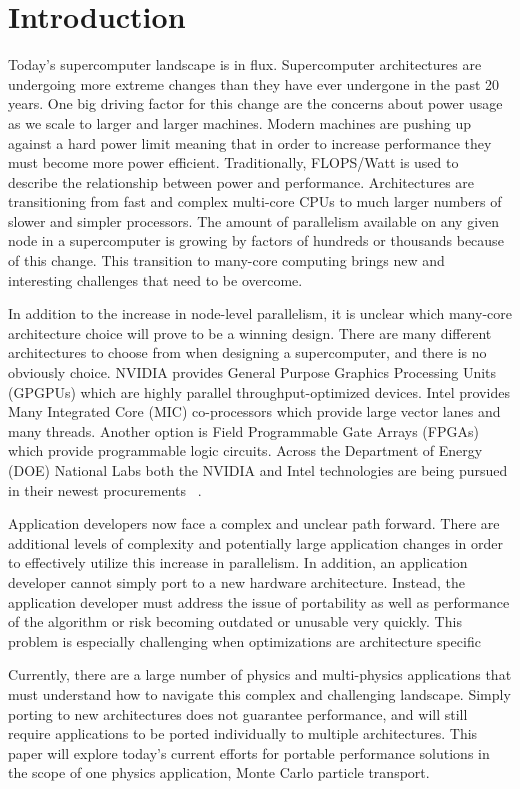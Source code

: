 \section{ \textbf{Introduction}}

Today's supercomputer landscape is in flux.
%
Supercomputer architectures are undergoing more extreme changes than they have ever undergone in the past 20 years.
%
One big driving factor for this change are the concerns about power usage as we scale to larger and larger machines.
%
Modern machines are pushing up against a hard power limit meaning that in order to increase performance they must become more power efficient.
%
Traditionally, FLOPS/Watt is used to describe the relationship between power and performance.
%
Architectures are transitioning from fast and complex multi-core CPUs to much larger numbers of slower and simpler processors.
%
The amount of parallelism available on any given node in a supercomputer is growing by factors of hundreds or thousands because of this change.
%
This transition to many-core computing brings new and interesting challenges that need to be overcome.
%

%
In addition to the increase in node-level parallelism, it is unclear which many-core architecture choice will prove to be a winning design.
%
There are many different architectures to choose from when designing a supercomputer, and there is no obviously choice.
%
NVIDIA provides General Purpose Graphics Processing Units (GPGPUs) which are highly parallel throughput-optimized devices.
%
Intel provides Many Integrated Core (MIC) co-processors which provide large vector lanes and many threads.
%
Another option is Field Programmable Gate Arrays (FPGAs) which provide programmable logic circuits.
%
Across the Department of Energy (DOE) National Labs both the NVIDIA and Intel technologies are being pursued in their newest procurements ~\cite{coralWeb, trinityWeb}.
%

Application developers now face a complex and unclear path forward.
%
There are additional levels of complexity and potentially large application changes in order to effectively utilize this increase in parallelism.
%
In addition, an application developer cannot simply port to a new hardware architecture.
%
Instead, the application developer must address the issue of portability as well as performance of the algorithm or risk becoming outdated or unusable very quickly.
%
This problem is especially challenging when optimizations are architecture specific
%

%
Currently, there are a large number of physics and multi-physics applications that must understand how to navigate this complex and challenging landscape.
%
Simply porting to new architectures does not guarantee performance, and will still require applications to be ported individually to multiple architectures.
%
This paper will explore today's current efforts for portable performance solutions in the scope of one physics application, Monte Carlo particle transport.
%

